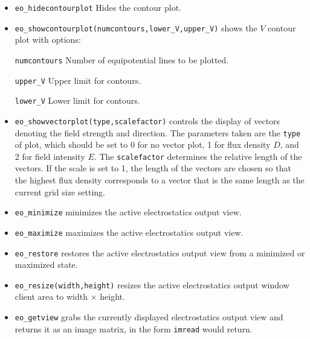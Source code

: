 \begin{itemize}
\texttt{gscale} Set to 0 for a colour density plot or 1 for a grey scale
density plot.

\texttt{upper{\_}D} Sets the upper display limit for the density plot.

\texttt{lower{\_}D} Sets the lower display limit for the density plot.

\texttt{type} Sets the type of density plot. A value of 0 plots voltage, 1
plots the magnitude of $D$, and 2 plots the magnitude of $E$

\item \texttt{eo\_hidecontourplot} Hides the contour plot.

\item \texttt{eo\_showcontourplot(numcontours,lower{\_}V,upper{\_}V)} shows the
$V$ contour plot with options:

\texttt{numcontours} Number of equipotential lines to be plotted.

\texttt{upper{\_}V} Upper limit for contours.

\texttt{lower{\_}V} Lower limit for contours.

\item \texttt{eo\_showvectorplot(type,scalefactor)}
controls the display of vectors denoting the field strength and
direction. The parameters taken are the \texttt{type} of plot,
which should be set to 0 for no vector plot, 1 for flux density
$D$, and 2 for field intensity $E$. The \texttt{scalefactor}
determines the relative length of the vectors. If the scale is set
to 1, the length of the vectors are chosen so that the highest flux
density corresponds to a vector that is the same length as the
current grid size setting.

\item{\tt eo\_minimize} minimizes the active electrostatics output view.
\item{\tt eo\_maximize} maximizes the active electrostatics output view.
\item{\tt eo\_restore} restores the active electrostatics output view from a
 minimized or maximized state.
\item{\tt eo\_resize(width,height)} resizes the active electrostatics output
 window client area to width $\times$ height.

\item{\tt eo\_getview} grabs the currently displayed electrostatics output view and
 returns it as an image matrix, in the form \texttt{imread} would return.

\end{itemize}

